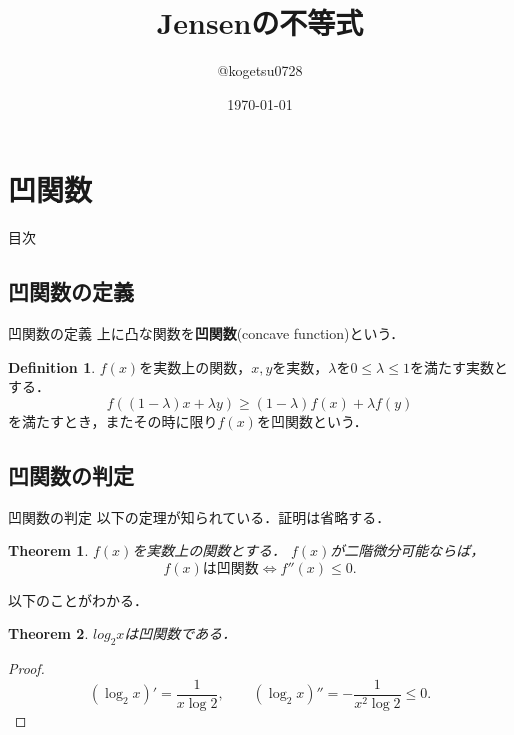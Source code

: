 \documentclass[dvipdfmx]{beamer}
\title{
    Jensenの不等式
}
\author{@kogetsu0728}
\date{\today}
\theoremstyle{plain}
\newtheorem{thm}{Theorem}
\theoremstyle{definition}
\newtheorem{dfn}{Definition}
\begin{document}
\maketitle

\section{凹関数}
\begin{frame}{目次}
	\tableofcontents[currentsection]
\end{frame}

\subsection{凹関数の定義}
\begin{frame}{凹関数の定義}
    上に凸な関数を\textbf{凹関数}(concave function)という\cite{lit:proof}．
    \begin{dfn}
        $f(x)$を実数上の関数，$x,y$を実数，$\lambda$を$0 \le \lambda \le 1$を満たす実数とする．
        \[
            f((1-\lambda)x + \lambda y) \ge (1-\lambda)f(x) + \lambda f(y)
        \]
        を満たすとき，またその時に限り$f(x)$を凹関数という．
    \end{dfn}
\end{frame}

\subsection{凹関数の判定}
\begin{frame}{凹関数の判定}
    以下の定理が知られている．証明は省略する．

    \begin{thm}
        $f(x)$を実数上の関数とする． $f(x)$が二階微分可能ならば，
        \[
            \text{$f(x)$は凹関数} \iff f''(x) \le 0.
        \]
    \end{thm}

    以下のことがわかる．

    \begin{thm}
        $log_2 x$は凹関数である．
    \end{thm}

    \begin{proof}
        \[
            (\log_2 x)' = \frac{1}{x \log 2}, \qquad
            (\log_2 x)'' = -\frac{1}{x^2 \log 2} \le 0.
        \]
    \end{proof}
\end{frame}
\end{document}
